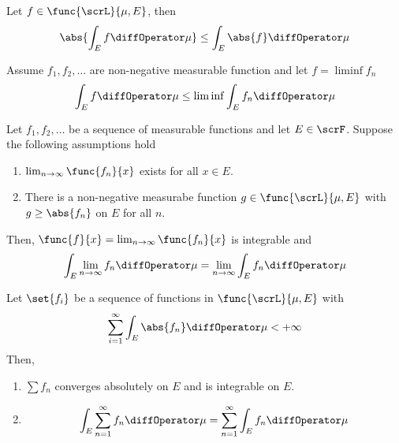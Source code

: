 \begin{corollary}
    Let \(f \in \func{\scrL}{\mu,E}\), then 
    \begin{equation*}
        \abs{\int_E f \diffOperator \mu} \leq \int_E \abs{f} \diffOperator \mu 
    \end{equation*}
\end{corollary}

\begin{lemma}
    Assume \(f_1, f_2, \dots\) are non-negative measurable function and let \(f = \liminf f_n\)
    \begin{equation*}
        \int_E f \diffOperator \mu \leq \liminf \int_E f_n \diffOperator \mu 
    \end{equation*}
\end{lemma}

\begin{theorem}
    Let \(f_1, f_2, \dots \) be a sequence of measurable functions and let \(E \in \scrF\). Suppose the following assumptions hold 
    \begin{enumerate}
        \item \(\lim_{n \to \infty} \func{f_n}{x}\) exists for all \(x \in E\).
        \item There is a non-negative measurabe function \(g \in \func{\scrL}{\mu,E}\) with \(g \geq \abs{f_n}\) on \(E\) for all \(n\).
    \end{enumerate}
    Then, \(\func{f}{x} = \lim_{n \to \infty} \func{f_n}{x}\) is integrable and 
    \begin{equation*}
        \int_E \lim_{n \to \infty} f_n \diffOperator \mu = \lim_{n \to \infty} \int_E f_n \diffOperator \mu
    \end{equation*}
\end{theorem}

\begin{corollary}
    Let \(\set{f_i}\) be a sequence of functions in \(\func{\scrL}{\mu,E}\) with 
    \begin{equation*}
        \sum_{i = 1}^{\infty} \int_E \abs{f_n} \diffOperator \mu < + \infty 
    \end{equation*}
    Then, 
    \begin{enumerate}
        \item \(\sum f_n\) converges absolutely \alev on \(E\) and is integrable on \(E\).
        \item  
        \begin{equation*}
            \int_E \sum_{n = 1}^{\infty} f_n \diffOperator \mu = \sum_{n = 1}^{\infty }\int_E f_n \diffOperator\mu 
        \end{equation*} 
    \end{enumerate}
\end{corollary}

